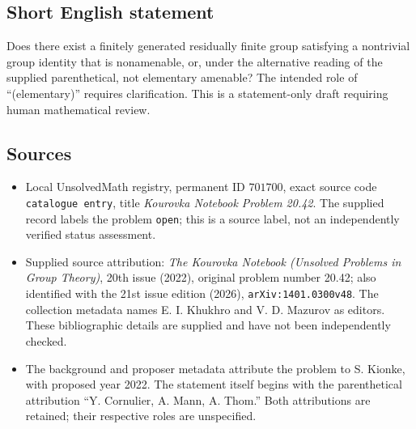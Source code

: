 \documentclass[11pt]{article}
\begin{document}
\subsection{Short English statement}
Does there exist a finitely generated residually finite group satisfying a nontrivial group identity that is nonamenable, or, under the alternative reading of the supplied parenthetical, not elementary amenable? The intended role of ``(elementary)'' requires clarification. This is a statement-only draft requiring human mathematical review.
\subsection{Sources}
\begin{itemize}
\item Local UnsolvedMath registry, permanent ID \(701700\), exact source code \texttt{catalogue entry}, title \emph{Kourovka Notebook Problem 20.42}. The supplied record labels the problem \texttt{open}; this is a source label, not an independently verified status assessment.
\item Supplied source attribution: \emph{The Kourovka Notebook (Unsolved Problems in Group Theory)}, 20th issue (2022), original problem number 20.42; also identified with the 21st issue edition (2026), \texttt{arXiv:1401.0300v48}. The collection metadata names E. I. Khukhro and V. D. Mazurov as editors. These bibliographic details are supplied and have not been independently checked.
\item The background and proposer metadata attribute the problem to S. Kionke, with proposed year 2022. The statement itself begins with the parenthetical attribution ``Y. Cornulier, A. Mann, A. Thom.'' Both attributions are retained; their respective roles are unspecified.
\end{itemize}
\end{document}
